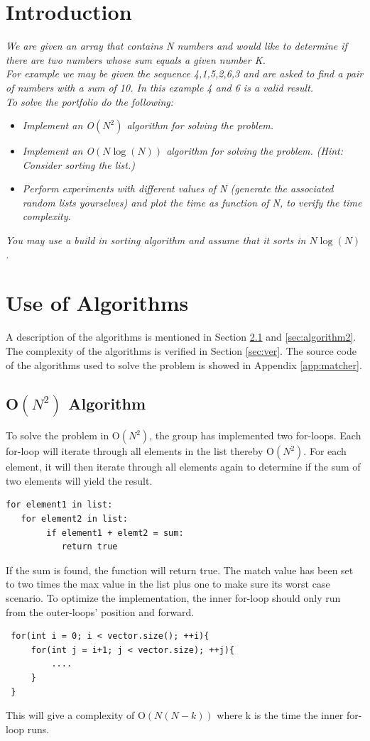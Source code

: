 \section{Introduction}
\emph{We are given an array that contains N numbers and would like to determine if there are two numbers whose sum equals a given number K.\\
For example we may be given the sequence 4,1,5,2,6,3 and are asked to find a pair of numbers with a sum of 10. In this example 4 and 6 is a valid result.\\
To solve the portfolio do the following:}
\begin{itemize}

\item \emph{Implement an O\(\left( { N }^{ 2 } \right)\) algorithm for solving the problem.}
\item \emph{Implement an O\(\left( N\log {(N)}  \right) \) algorithm for solving the problem. (Hint: Consider sorting the list.)}
\item \emph{Perform experiments with different values of N (generate the associated random lists yourselves)
and plot the time as function of N, to verify the time complexity.}
\end{itemize}
\emph{You may use a build in sorting algorithm and assume that it sorts in \( N\log {(N) }  \).}

\section{Use of Algorithms}
A description of the algorithms is mentioned in Section \ref{sec:algorithm1} and \ref{sec:algorithm2}. 
The complexity of the algorithms is verified in Section \ref{sec:ver}.
The source code of the algorithms used to solve the problem is showed in Appendix \ref{app:matcher}.


\subsection{O\(\left( { N }^{ 2 } \right)\) Algorithm}
\label{sec:algorithm1} 
To solve the problem in O\(\left( { N }^{ 2 } \right)\), the group has implemented two for-loops. Each for-loop will iterate through all elements in the list thereby O\(\left( { N }^{ 2 } \right)\). For each element, it will then iterate through all elements again to determine if the sum of two elements will yield the result.
\begin{lstlisting}
for element1 in list:
   for element2 in list:
        if element1 + elemt2 = sum:
           return true
\end{lstlisting}
If the sum is found, the function will return true.
The match value has been set to two times the max value in the list plus one to make sure its worst case scenario.
To optimize the implementation, the inner for-loop should only run from the outer-loops' position and forward.
\begin{lstlisting}
 for(int i = 0; i < vector.size(); ++i){
     for(int j = i+1; j < vector.size); ++j){
         ....
     }
 }
\end{lstlisting}
This will give a complexity of O\(\left(N\left(  N - k \right)\right)\) where k is the time the inner for-loop runs.

